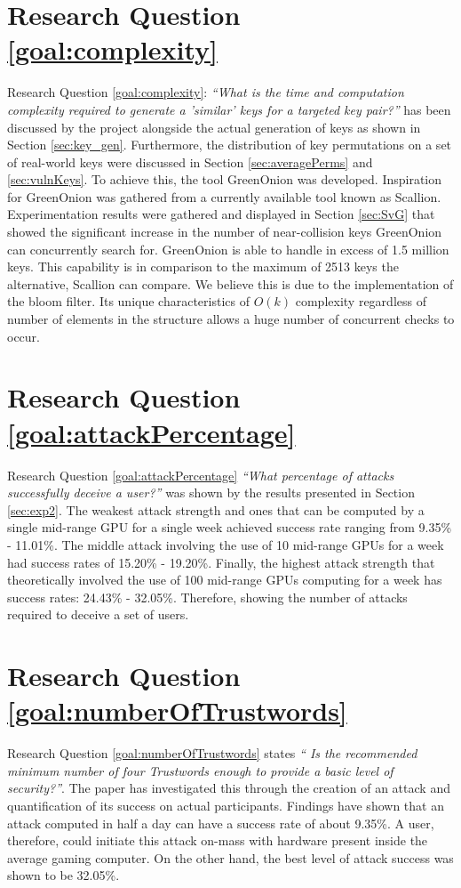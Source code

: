 \section{Research Question \ref{goal:complexity}}
Research Question \ref{goal:complexity}: \textit{``What is the time and computation complexity required to generate a ’similar’ keys for a targeted key pair?''} has been discussed by the project alongside the actual generation of keys as shown in Section \ref{sec:key_gen}. Furthermore, the distribution of key permutations on a set of real-world keys were discussed in Section \ref{sec:averagePerms} and \ref{sec:vulnKeys}. To achieve this, the tool GreenOnion was developed. Inspiration for GreenOnion was gathered from a currently available tool known as Scallion. Experimentation results were gathered and displayed in Section \ref{sec:SvG} that showed the significant increase in the number of near-collision keys GreenOnion can concurrently search for. GreenOnion is able to handle in excess of 1.5 million keys. This capability is in comparison to the maximum of 2513 keys the alternative, Scallion can compare. We believe this is due to the implementation of the bloom filter. Its unique characteristics of $O(k)$ complexity regardless of number of elements in the structure allows a huge number of concurrent checks to occur. 

\section{Research Question \ref{goal:attackPercentage}}
Research Question \ref{goal:attackPercentage} \textit{``What percentage of attacks successfully deceive a user?''} was shown by the results presented in Section \ref{sec:exp2}. The weakest attack strength and ones that can be computed by a single mid-range GPU for a single week achieved success rate ranging from 9.35\% - 11.01\%. The middle attack involving the use of 10 mid-range GPUs for a week had success rates of 15.20\% - 19.20\%. Finally, the highest attack strength that theoretically involved the use of 100 mid-range GPUs computing for a week has success rates: 24.43\% - 32.05\%. Therefore, showing the number of attacks required to deceive a set of users.

\section{Research Question \ref{goal:numberOfTrustwords}}
Research Question \ref{goal:numberOfTrustwords} states \textit{`` Is the recommended minimum number of four Trustwords enough to provide a basic level of security?''}. The paper has investigated this through the creation of an attack and quantification of its success on actual participants. Findings have shown that an attack computed in half a day can have a success rate of about 9.35\%. A user, therefore, could initiate this attack on-mass with hardware present inside the average gaming computer. On the other hand, the best level of attack success was shown to be 32.05\%. 

